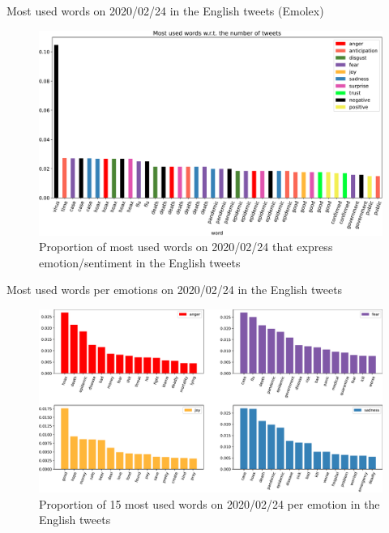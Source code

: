 \documentclass[9pt,aspectratio=1610]{beamer}  %
\begin{document}
\begin{frame}{Most used words on 2020/02/24 in the English tweets (Emolex)}

    \begin{figure}[H]
	    \centering
    	\includegraphics[scale=.30]{assets/img/en_most_used_words_2020_02_24.svg.pdf}
    	\caption{Proportion of most used words on 2020/02/24 that express emotion/sentiment in the English tweets}
    	\label{fig:en-most-used-word-2020-02-24}
    \end{figure}
    
\end{frame}

\begin{frame}{Most used words per emotions on 2020/02/24 in the English tweets}

    \begin{figure}[H]
	    \centering
    	\includegraphics[scale=.30]{assets/img/en_most_used_words_4_emotions_2020_02_24_subplot.svg.pdf}
    	\caption{Proportion of 15 most used words on 2020/02/24 per emotion in the English tweets}
    	\label{fig:en-most-used-word-subplot-2020-02-24}
    \end{figure}
    
\end{frame}
\end{document}
